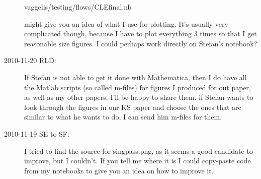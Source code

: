 \begin{description}
vaggelis/testing/flows/CLEfinal.nb

might give you an idea of what I use for plotting. It's usually very
complicated though, because I have to plot everything 3 times so that
I get reasonable size figures. I could perhaps work directly on
Stefan's notebook?

\item[2010-11-20 RLD:]
If Stefan is not able to get it done with Mathematica, then I do have all
the Matlab scripts (so called m-files) for figures I produced for out
paper, as well as my other papers.  I'll be happy to share them. if
Stefan wants to look through the figures in our KS paper and choose the
ones that are similar to what he wants to do, I can send him m-files for
them.

\item[2010-11-19 SE to SF:]
I tried to find the source for singpass.png, as it seems a good candidate
to improve, but I couldn't. If you tell me where it is I could copy-paste
code from my notebooks to give you an idea on how to improve it.


\end{description}
